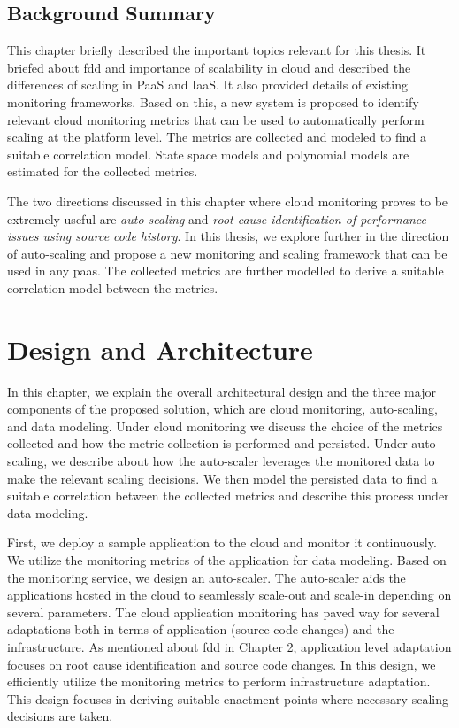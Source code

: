\documentclass[article,type=msc,colorback,12pt,accentcolor=tud8b,table]{tudthesis}
\begin{document}
\subsection{Background Summary}
This chapter briefly described the important topics relevant for this thesis. It briefed about \gls{fdd} and importance of scalability in cloud and described the differences of scaling in PaaS and IaaS. It also provided details of existing monitoring frameworks. Based on this, a new system is proposed to identify relevant cloud monitoring metrics that can be used to automatically perform scaling at the platform level. The metrics are collected and modeled to find a suitable correlation model. State space models and polynomial models are estimated for the collected metrics. 

The two directions discussed in this chapter where cloud monitoring proves to be extremely useful are \textit{auto-scaling} and \textit{root-cause-identification of performance issues using source code history}. In this thesis, we explore further in the direction of auto-scaling and propose a new monitoring and scaling framework that can be used in any \gls{paas}. The collected metrics are further modelled to derive a suitable correlation model between the metrics.
	
 \cleardoublepage

 \hfill 
 \section{Design and Architecture}	
 \hfill \break
 
 In this chapter, we explain the overall architectural design and the three major components of the proposed solution, which are cloud monitoring, auto-scaling, and data modeling. Under cloud monitoring we discuss the choice of the metrics collected and how the metric collection is performed and persisted. Under auto-scaling, we describe about how the auto-scaler leverages the monitored data to make the relevant scaling decisions. We then model the persisted data to find a suitable correlation between the collected metrics and describe this process under data modeling. 
 
 	First, we deploy a sample application to the cloud and monitor it continuously. We utilize the monitoring metrics of the application for data modeling. Based on the monitoring service, we design an auto-scaler. The auto-scaler aids the applications hosted in the cloud to seamlessly scale-out and scale-in depending on several parameters. The cloud application monitoring has paved way for several adaptations both in terms of application (source code changes) and the infrastructure. As mentioned about \gls{fdd}  in Chapter 2, application level adaptation focuses on root cause identification and source code changes. In this design, we efficiently utilize  the monitoring metrics to perform infrastructure adaptation.  This design focuses in deriving suitable enactment points where necessary scaling decisions are taken. 
 
\end{document}
